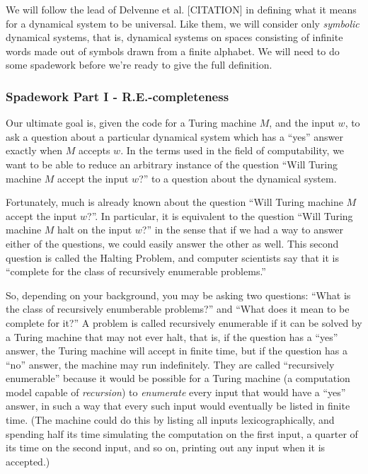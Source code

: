 \documentclass{fkpaper}
\begin{document}
\begin{multicols}{2}
We will follow the lead of Delvenne et al. [CITATION] in defining what
it means for a dynamical system to be universal. Like them, we will
consider only {\it symbolic} dynamical systems, that is, dynamical
systems on spaces consisting of infinite words made out of symbols
drawn from a finite alphabet. We will need to do some spadework before
we're ready to give the full definition.

\subsubsection*{Spadework Part I - R.E.-completeness}

Our ultimate goal is, given the code for a Turing machine $M$, and the
input $w$, to ask a question about a particular dynamical system which
has a ``yes'' answer exactly when $M$ accepts $w$. In the terms used
in the field of computability, we want to be able to reduce an
arbitrary instance of the question ``Will Turing machine $M$ accept
the input $w$?'' to a question about the dynamical system.

Fortunately, much is already known about the question ``Will Turing
machine $M$ accept the input $w$?''. In particular, it is equivalent
to the question ``Will Turing machine $M$ halt on the input $w$?'' in
the sense that if we had a way to answer either of the questions, we
could easily answer the other as well. This second question is called
the Halting Problem, and computer scientists say that it is ``complete
for the class of recursively enumerable problems.''

So, depending on your background, you may be asking two questions:
``What is the class of recursively enumberable problems?'' and ``What
does it mean to be complete for it?'' A problem is called recursively
enumerable if it can be solved by a Turing machine that may not ever
halt, that is, if the question has a ``yes'' answer, the Turing
machine will accept in finite time, but if the question has a ``no''
answer, the machine may run indefinitely. They are called
``recursively enumerable'' because it would be possible for a Turing
machine (a computation model capable of {\it recursion}) to {\it
  enumerate} every input that would have a ``yes'' answer, in such a
way that every such input would eventually be listed in finite time.
(The machine could do this by listing all inputs lexicographically,
and spending half its time simulating the computation on the first
input, a quarter of its time on the second input, and so on, printing
out any input when it is accepted.)


\end{multicols}
\end{document}

